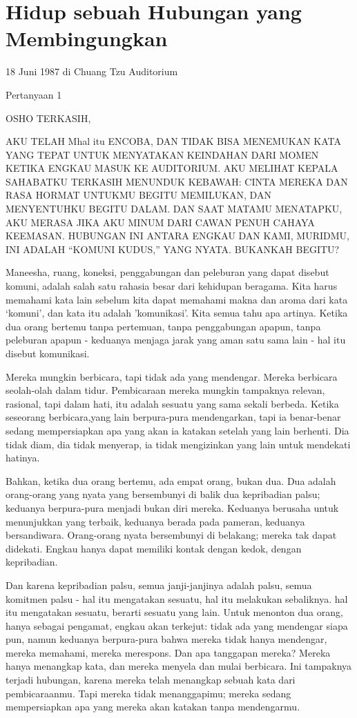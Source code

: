 \chapter{Hidup sebuah Hubungan yang Membingungkan}

18 Juni 1987 di Chuang Tzu Auditorium

Pertanyaan 1

OSHO TERKASIH,

AKU TELAH Mhal itu ENCOBA, DAN TIDAK BISA MENEMUKAN KATA YANG TEPAT UNTUK MENYATAKAN KEINDAHAN DARI MOMEN KETIKA ENGKAU MASUK KE AUDITORIUM. AKU MELIHAT KEPALA SAHABATKU TERKASIH MENUNDUK KEBAWAH: CINTA MEREKA DAN RASA HORMAT UNTUKMU BEGITU MEMILUKAN, DAN MENYENTUHKU BEGITU DALAM. DAN SAAT MATAMU MENATAPKU, AKU MERASA JIKA AKU MINUM DARI CAWAN PENUH CAHAYA KEEMASAN. HUBUNGAN INI ANTARA ENGKAU DAN KAMI, MURIDMU, INI ADALAH “KOMUNI KUDUS,” YANG NYATA. BUKANKAH BEGITU?

Maneesha, ruang, koneksi, penggabungan dan peleburan yang dapat disebut komuni, adalah salah satu rahasia besar dari kehidupan beragama. Kita harus memahami kata lain sebelum kita dapat memahami makna dan aroma dari kata ‘komuni’, dan kata itu adalah 'komunikasi'. Kita semua tahu apa artinya. Ketika dua orang bertemu tanpa pertemuan, tanpa penggabungan apapun, tanpa peleburan apapun - keduanya menjaga jarak yang aman satu sama lain - hal itu disebut komunikasi.

Mereka mungkin berbicara, tapi tidak ada yang mendengar. Mereka berbicara seolah-olah dalam tidur. Pembicaraan mereka mungkin tampaknya relevan, rasional, tapi dalam hati, itu adalah sesuatu yang sama sekali berbeda. Ketika seseorang berbicara,yang lain berpura-pura mendengarkan, tapi ia benar-benar sedang mempersiapkan apa yang akan ia katakan setelah yang lain berhenti. Dia tidak diam, dia tidak menyerap, ia tidak mengizinkan yang lain untuk mendekati hatinya.

Bahkan, ketika dua orang bertemu, ada empat orang, bukan dua. Dua adalah orang-orang yang nyata yang bersembunyi di balik dua kepribadian palsu; keduanya berpura-pura menjadi bukan diri mereka. Keduanya berusaha untuk menunjukkan yang terbaik, keduanya berada pada pameran, keduanya bersandiwara. Orang-orang nyata bersembunyi di belakang; mereka tak dapat didekati. Engkau hanya dapat memiliki kontak dengan kedok, dengan kepribadian.

Dan karena kepribadian palsu, semua janji-janjinya adalah palsu, semua komitmen palsu - hal itu mengatakan sesuatu, hal itu melakukan sebaliknya. hal itu mengatakan sesuatu, berarti sesuatu yang lain. Untuk menonton dua orang, hanya sebagai pengamat, engkau akan terkejut: tidak ada yang mendengar siapa pun, namun keduanya berpura-pura bahwa mereka tidak hanya mendengar, mereka memahami, mereka merespons. Dan apa tanggapan mereka? Mereka hanya menangkap kata, dan mereka menyela dan mulai berbicara. Ini tampaknya terjadi hubungan, karena mereka telah menangkap sebuah kata dari pembicaraanmu. Tapi mereka tidak menanggapimu; mereka sedang mempersiapkan apa yang mereka akan katakan tanpa mendengarmu.


